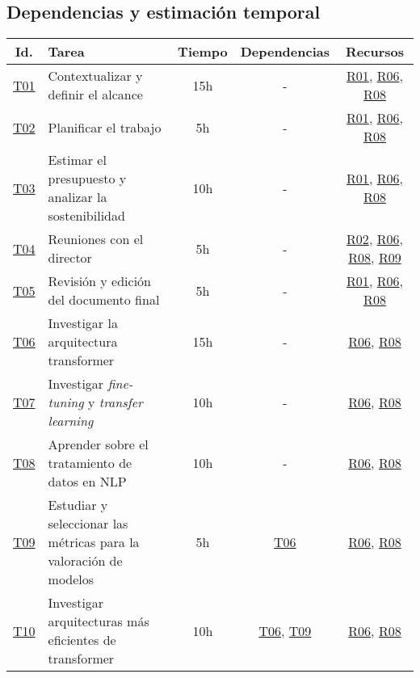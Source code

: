 \begin{landscape}
    \begin{table}
    \subsection{Dependencias y estimación temporal}\label{estimaciontemporal}
    \centering
    \begin{tabular}{ | c | l | c | c | c | }
        \hline
        Id. & Tarea & Tiempo & Dependencias & Recursos \\
        \hline
        \hyperref[T01]{T01} & Contextualizar y definir el alcance & 15h & - & \hyperref[R01]{R01}, \hyperref[R06]{R06}, \hyperref[R08]{R08} \\
        \hline
        \hyperref[T02]{T02} & Planificar el trabajo & 5h & - & \hyperref[R01]{R01}, \hyperref[R06]{R06}, \hyperref[R08]{R08} \\
        \hline
        \hyperref[T03]{T03} & Estimar el presupuesto y analizar la sostenibilidad & 10h & - & \hyperref[R01]{R01}, \hyperref[R06]{R06}, \hyperref[R08]{R08} \\
        \hline
        \hyperref[T04]{T04} & Reuniones con el director & 5h & - & \hyperref[R02]{R02}, \hyperref[R06]{R06}, \hyperref[R08]{R08}, \hyperref[R09]{R09} \\
        \hline
        \hyperref[T05]{T05} & Revisión y edición del documento final & 5h & - & \hyperref[R01]{R01}, \hyperref[R06]{R06}, \hyperref[R08]{R08} \\
        \hline
        \hyperref[T06]{T06} & Investigar la arquitectura transformer & 15h & - & \hyperref[R06]{R06}, \hyperref[R08]{R08} \\
        \hline
        \hyperref[T07]{T07} & Investigar \textit{fine-tuning} y \textit{transfer learning} & 10h & - & \hyperref[R06]{R06}, \hyperref[R08]{R08} \\
        \hline
        \hyperref[T08]{T08} & Aprender sobre el tratamiento de datos en NLP & 10h & - & \hyperref[R06]{R06}, \hyperref[R08]{R08} \\
        \hline
        \hyperref[T09]{T09} & Estudiar y seleccionar las métricas para la valoración de
        modelos & 5h & \hyperref[T06]{T06} & \hyperref[R06]{R06}, \hyperref[R08]{R08} \\
        \hline
        \hyperref[T10]{T10} & Investigar arquitecturas más eficientes de transformer & 10h & \hyperref[T06]{T06}, \hyperref[T09]{T09} & \hyperref[R06]{R06}, \hyperref[R08]{R08} \\

\end{tabular}
\end{table}
\end{landscape}

